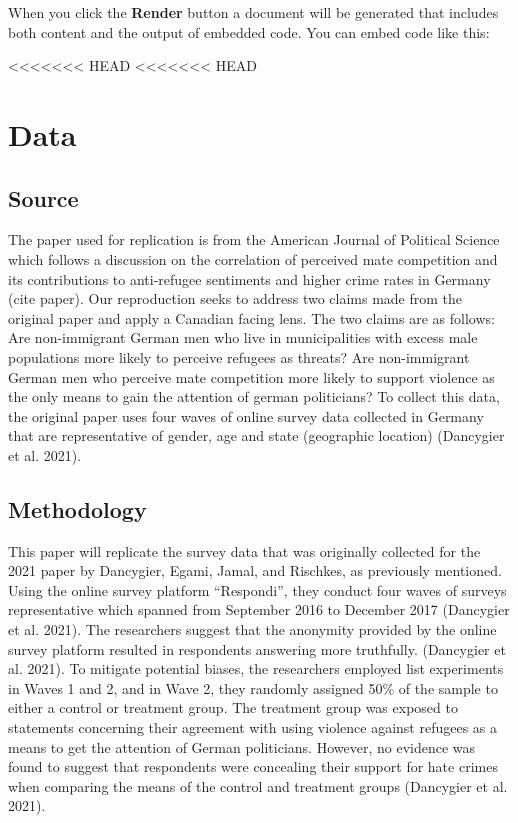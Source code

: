 \documentclass[
]{article}
\begin{document}
When you click the \textbf{Render} button a document will be generated
that includes both content and the output of embedded code. You can
embed code like this:

\textless\textless\textless\textless\textless\textless\textless{} HEAD
\textless\textless\textless\textless\textless\textless\textless{} HEAD

\hypertarget{data}{%
\section{Data}\label{data}}

\hypertarget{source}{%
\subsection{Source}\label{source}}

The paper used for replication is from the American Journal of Political
Science which follows a discussion on the correlation of perceived mate
competition and its contributions to anti-refugee sentiments and higher
crime rates in Germany (cite paper). Our reproduction seeks to address
two claims made from the original paper and apply a Canadian facing
lens. The two claims are as follows: Are non-immigrant German men who
live in municipalities with excess male populations more likely to
perceive refugees as threats? Are non-immigrant German men who perceive
mate competition more likely to support violence as the only means to
gain the attention of german politicians? To collect this data, the
original paper uses four waves of online survey data collected in
Germany that are representative of gender, age and state (geographic
location) (Dancygier et al. 2021).

\hypertarget{methodology}{%
\subsection{Methodology}\label{methodology}}

This paper will replicate the survey data that was originally collected
for the 2021 paper by Dancygier, Egami, Jamal, and Rischkes, as
previously mentioned. Using the online survey platform ``Respondi'',
they conduct four waves of surveys representative which spanned from
September 2016 to December 2017 (Dancygier et al. 2021). The researchers
suggest that the anonymity provided by the online survey platform
resulted in respondents answering more truthfully. (Dancygier et al.
2021). To mitigate potential biases, the researchers employed list
experiments in Waves 1 and 2, and in Wave 2, they randomly assigned 50\%
of the sample to either a control or treatment group. The treatment
group was exposed to statements concerning their agreement with using
violence against refugees as a means to get the attention of German
politicians. However, no evidence was found to suggest that respondents
were concealing their support for hate crimes when comparing the means
of the control and treatment groups (Dancygier et al. 2021).
\end{document}
